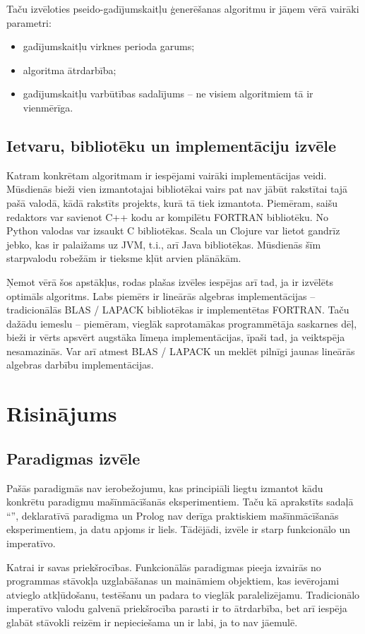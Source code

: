 \documentclass{ludis}
\begin{document}
Taču izvēloties pseido-gadījumskaitļu ģenerēšanas algoritmu ir jāņem vērā vairāki parametri:
\begin{itemize}
\item gadījumskaitļu virknes perioda garums;
\item algoritma ātrdarbība;
\item gadījumskaitļu varbūtības sadalījums -- ne visiem algoritmiem tā ir vienmērīga.
\end{itemize}

\section{Ietvaru, bibliotēku un implementāciju izvēle}
Katram konkrētam algoritmam ir iespējami vairāki implementācijas veidi. Mūsdienās bieži vien izmantotajai bibliotēkai vairs pat nav jābūt rakstītai tajā pašā valodā, kādā rakstīts projekts, kurā tā tiek izmantota. Piemēram, saišu redaktors var savienot C++ kodu ar kompilētu FORTRAN bibliotēku. No Python valodas var izsaukt C bibliotēkas. Scala un Clojure var lietot gandrīz jebko, kas ir palaižams uz JVM, t.i., arī Java bibliotēkas. Mūsdienās šīm starpvalodu robežām ir tieksme kļūt arvien plānākām.

Ņemot vērā šos apstākļus, rodas plašas izvēles iespējas arī tad, ja ir izvēlēts optimāls algoritms. Labs piemērs ir lineārās algebras implementācijas -- tradicionālās BLAS / LAPACK bibliotēkas ir implementētas FORTRAN. Taču dažādu iemeslu -- piemēram, vieglāk saprotamākas programmētāja saskarnes dēļ, bieži ir vērts apsvērt augstāka līmeņa implementācijas, īpaši tad, ja veiktspēja nesamazinās. Var arī atmest BLAS / LAPACK un meklēt pilnīgi jaunas lineārās algebras darbību implementācijas.

\chapter{Risinājums}
\section{Paradigmas izvēle} \label{sec:paradigm_choice}
Pašās paradigmās nav ierobežojumu, kas principiāli liegtu izmantot kādu konkrētu paradigmu mašīnmācīšanās eksperimentiem. Taču kā aprakstīts sadaļā ``'', deklaratīvā paradigma un Prolog nav derīga praktiskiem mašīnmācīšanās eksperimentiem, ja datu apjoms ir liels. Tādējādi, izvēle ir starp funkcionālo un imperatīvo.

Katrai ir savas priekšrocības. Funkcionālās paradigmas pieeja izvairās no programmas stāvokļa uzglabāšanas un maināmiem objektiem, kas ievērojami atvieglo atkļūdošanu, testēšanu un padara to vieglāk paralelizējamu. Tradicionālo imperatīvo valodu galvenā priekšrocība parasti ir to ātrdarbība, bet arī iespēja glabāt stāvokli reizēm ir nepieciešama un ir labi, ja to nav jāemulē.
\end{document}
